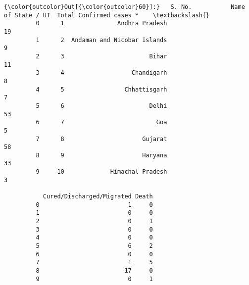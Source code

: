 \documentclass[11pt]{article}
\begin{document}
\begin{Verbatim}[commandchars=\\\{\}]
{\color{outcolor}Out[{\color{outcolor}60}]:}   S. No.           Name of State / UT  Total Confirmed cases *    \textbackslash{}
         0      1               Andhra Pradesh                       19     
         1      2  Andaman and Nicobar Islands                        9     
         2      3                        Bihar                       11     
         3      4                   Chandigarh                        8     
         4      5                 Chhattisgarh                        7     
         5      6                        Delhi                       53     
         6      7                          Goa                        5     
         7      8                      Gujarat                       58     
         8      9                      Haryana                       33     
         9     10             Himachal Pradesh                        3     
         
           Cured/Discharged/Migrated Death  
         0                         1     0  
         1                         0     0  
         2                         0     1  
         3                         0     0  
         4                         0     0  
         5                         6     2  
         6                         0     0  
         7                         1     5  
         8                        17     0  
         9                         0     1  
\end{Verbatim}
            
\end{document}
